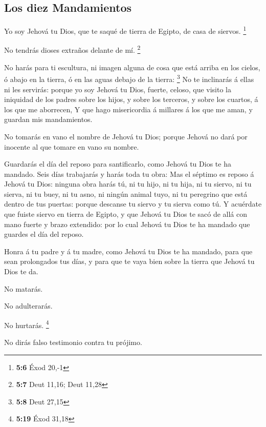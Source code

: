 \hypertarget{los-diez-mandamientos}{%
\subsection{Los diez Mandamientos}\label{los-diez-mandamientos}}

 Yo soy Jehová tu Dios, que te saqué de tierra de Egipto,
de casa de siervos. \footnote{\textbf{5:6} Éxod 20,-1}

 No tendrás dioses extraños delante de mí. \footnote{\textbf{5:7}
  Deut 11,16; Deut 11,28}

 No harás para ti escultura, ni imagen alguna de cosa que
está arriba en los cielos, ó abajo en la tierra, ó en las aguas debajo
de la tierra: \footnote{\textbf{5:8} Deut 27,15}  No te
inclinarás á ellas ni les servirás: porque yo soy Jehová tu Dios,
fuerte, celoso, que visito la iniquidad de los padres sobre los hijos, y
sobre los terceros, y sobre los cuartos, á los que me aborrecen,
 Y que hago misericordia á millares á los que me aman, y
guardan mis mandamientos.

 No tomarás en vano el nombre de Jehová tu Dios; porque
Jehová no dará por inocente al que tomare en vano su nombre.

 Guardarás el día del reposo para santificarlo, como
Jehová tu Dios te ha mandado.  Seis días trabajarás y
harás toda tu obra:  Mas el séptimo es reposo á Jehová tu
Dios: ninguna obra harás tú, ni tu hijo, ni tu hija, ni tu siervo, ni tu
sierva, ni tu buey, ni tu asno, ni ningún animal tuyo, ni tu peregrino
que está dentro de tus puertas: porque descanse tu siervo y tu sierva
como tú.  Y acuérdate que fuiste siervo en tierra de
Egipto, y que Jehová tu Dios te sacó de allá con mano fuerte y brazo
extendido: por lo cual Jehová tu Dios te ha mandado que guardes el día
del reposo.

 Honra á tu padre y á tu madre, como Jehová tu Dios te ha
mandado, para que sean prolongados tus días, y para que te vaya bien
sobre la tierra que Jehová tu Dios te da.

 No matarás.

 No adulterarás.

 No hurtarás. \footnote{\textbf{5:19} Éxod 31,18}

 No dirás falso testimonio contra tu prójimo.

